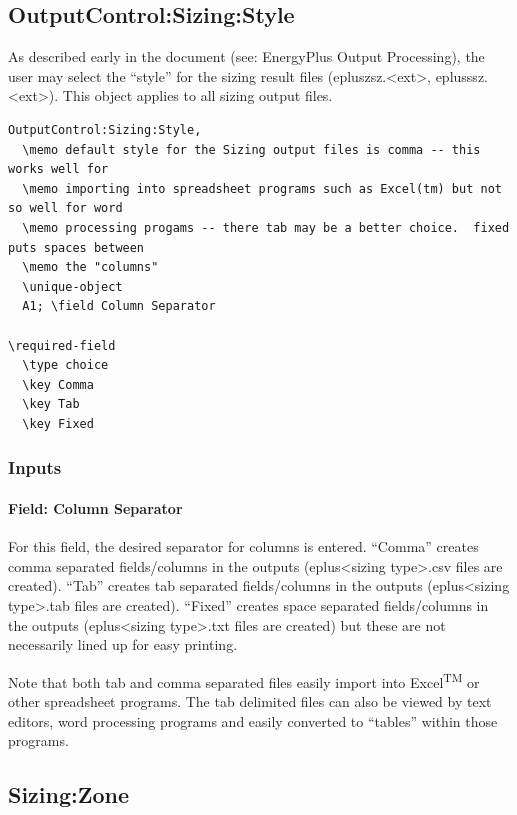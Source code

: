 \subsection{OutputControl:Sizing:Style}\label{outputcontrolsizingstyle}

As described early in the document (see: EnergyPlus Output Processing), the user may select the ``style'' for the sizing result files (epluszsz.\textless{}ext\textgreater{}, eplusssz.\textless{}ext\textgreater{}). This object applies to all sizing output files.

\begin{lstlisting}
OutputControl:Sizing:Style,
  \memo default style for the Sizing output files is comma -- this works well for
  \memo importing into spreadsheet programs such as Excel(tm) but not so well for word
  \memo processing progams -- there tab may be a better choice.  fixed puts spaces between
  \memo the "columns"
  \unique-object
  A1; \field Column Separator

\required-field
  \type choice
  \key Comma
  \key Tab
  \key Fixed
\end{lstlisting}

\subsubsection{Inputs}\label{inputs-3-009}

\paragraph{Field: Column Separator}\label{field-column-separator-000}

For this field, the desired separator for columns is entered. ``Comma'' creates comma separated fields/columns in the outputs (eplus\textless{}sizing type\textgreater{}.csv files are created). ``Tab'' creates tab separated fields/columns in the outputs (eplus\textless{}sizing type\textgreater{}.tab files are created). ``Fixed'' creates space separated fields/columns in the outputs (eplus\textless{}sizing type\textgreater{}.txt files are created) but these are not necessarily lined up for easy printing.

Note that both tab and comma separated files easily import into Excel\textsuperscript{TM} or other spreadsheet programs. The tab delimited files can also be viewed by text editors, word processing programs and easily converted to ``tables'' within those programs.

\subsection{Sizing:Zone}\label{sizingzone}

